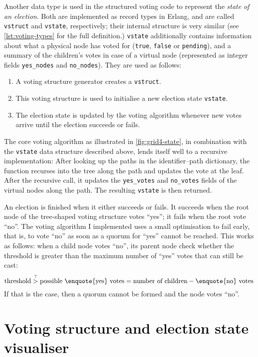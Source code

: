 \documentclass[11pt,chapterprefix=true,toc=bibliography,numbers=noendperiod,
               footnotes=multiple,twoside]{scrreprt}
\begin{document}
Another data type is used in the structured voting code to represent the \emph{state of an election}. Both are implemented as record types in Erlang, and are called \texttt{vstruct} and \texttt{vstate}, respectively; their internal structure is very similar (see \cref{lst:voting-types} for the full definition.) \texttt{vstate} additionally contains information about what a physical node has voted for (\texttt{true}, \texttt{false} or \texttt{pending}), and a summary of the children's votes in case of a virtual node (represented as integer fields \texttt{yes\_nodes} and \texttt{no\_nodes}). They are used as follows:

\begin{enumerate}
    \item A voting structure generator creates a \texttt{vstruct}.
    \item This voting structure is used to initialise a new election state \texttt{vstate}.
    \item The election state is updated by the voting algorithm whenever new votes arrive until the election succeeds or fails.
\end{enumerate}

The core voting algorithm as illustrated in \cref{fig:grid4-state}, in combination with the \texttt{vstate} data structure described above, lends itself well to a recursive implementation: After looking up the paths in the identifier--path dictionary, the function recurses into the tree along the path and updates the vote at the leaf. After the recursive call, it updates the \texttt{yes\_votes} and \texttt{no\_votes} fields of the virtual nodes along the path. The resulting \texttt{vstate} is then returned.

An election is finished when it either succeeds or fails. It succeeds when the root node of the tree-shaped voting structure votes \enquote{yes}; it fails when the root vote \enquote{no}. The voting algorithm I implemented uses a small optimisation to fail early, that is, to vote \enquote{no} as soon as a quorum for \enquote{yes} cannot be reached. This works as follows: when a child node votes \enquote{no}, its parent node check whether the threshold is greater than the maximum number of \enquote{yes} votes that can still be cast: \[ \text{threshold} \overset{?}{>} \text{possible \enquote{yes} votes} = \text{number of children} - \text{\enquote{no} votes} \] If that is the case, then a quorum cannot be formed and the node votes \enquote{no}.

\section{Voting structure and election state visualiser\label{sc:visualiser}}
\end{document}
